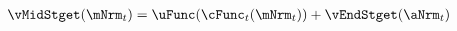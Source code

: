   \begin{equation}\begin{gathered}\begin{aligned}
\vMidStget(\mNrm_{\stge}) & = \uFunc(\cFunc_{\stge}(\mNrm_{\stge})) + \vEndStget(\aNrm_{\stge}) \label{eq:vMidStget}
      \end{aligned}\end{gathered}\end{equation}
